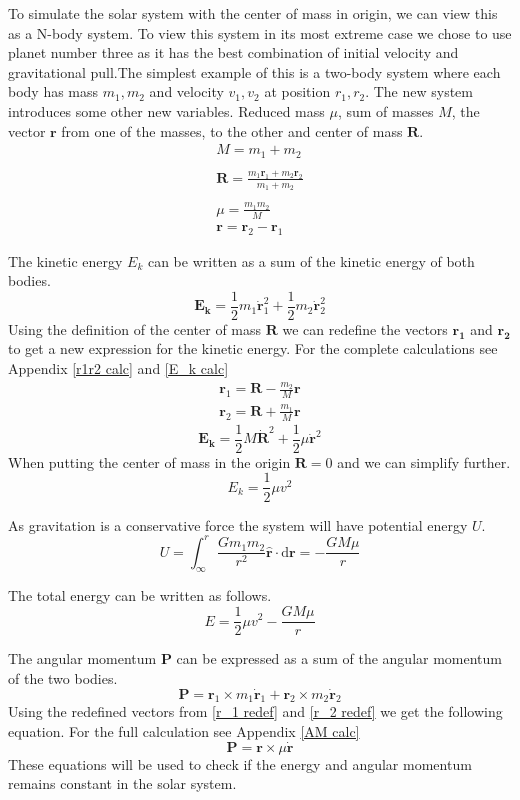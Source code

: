 \documentclass[reprint,english,notitlepage]{revtex4-2}
\begin{document}
To simulate the solar system with the center of mass in origin, we can view this as a N-body system. To view this system in its most extreme case we chose to use planet number three as it has the best combination of initial velocity and gravitational pull.The simplest example of this is a two-body system where each body has mass $ m_1 , m_2 $ and velocity $ v_1, v_2 $ at position $ r_1, r_2 $. The new system introduces some other new variables. Reduced mass $ \mu $, sum of masses $ M $, the vector $ \mathbf{r} $ from one of the masses, to the other and center of mass $ \mathbf{R} $.
\begin{align*}
	M = m_1 + m_2 \\ \\
	\mathbf{R} = \frac{m_1 \mathbf{r}_1 + m_2  \mathbf{r}_2}{m_1 + m_2} \\ \\
	μ = \frac{m_1 m_2}{M} \\ 
	\mathbf{r} = \mathbf{r}_2 - \mathbf{r}_1
\end{align*}



The kinetic energy $ E_k $ can be written as a sum of the kinetic energy of both bodies.
\[
\mathbf{E_k} = \frac{1}{2}m_1 \mathbf{\dot{r}}_{1}^{2} + \frac{1}{2}m_2 \mathbf{\dot{r}}_{2}^{2}
\]
Using the definition of the center of mass $ \mathbf{R} $ we can redefine the vectors $ \mathbf{r_1} $ and $ \mathbf{r_2} $ to get a new expression for the kinetic energy. For the complete calculations see Appendix \ref{r1r2 calc} and \ref{E_k calc}
\begin{align}
	\mathbf{r}_1 = \mathbf{R} - \frac{m_2}{M}\mathbf{r} \label{r_1 redef} \\
	\mathbf{r}_2 = \mathbf{R} + \frac{m_1}{M}\mathbf{r} \label{r_2 redef}
\end{align}
\[
\mathbf{E_k} = \frac{1}{2}M \mathbf{\dot{R}}^{2} + \frac{1}{2}μ \mathbf{\dot{r}}^{2} 
\]
When putting the center of mass in the origin $ \mathbf{R} = 0 $ and we can simplify further. 
\[
E_k = \frac{1}{2} μ v^{2}
\]

As gravitation is a conservative force the system will have potential energy $ U $. 
\[
U = ∫ _{\infty} ^{r} \frac{Gm_1 m_2}{r^{2}}\mathbf{\hat{r}} ⋅ \mathrm{d}\mathbf{r} = - \frac{GM \mu}{r}
\] 

The total energy can be written as follows. 
\[
E = \frac{1}{2}μ v^{2}  - \frac{GM\mu}{r}
\]

The angular momentum $ \mathbf{P} $ can be expressed as a sum of the angular momentum of the two bodies. 
\[
\mathbf{P} = \mathbf{r}_1 \times m_1 \mathbf{\dot{r}}_1 + \mathbf{r}_2 \times m_2 \mathbf{\dot{r}}_2
\]
Using the redefined vectors from \ref{r_1 redef} and \ref{r_2 redef}  we get the following equation. For the full calculation see Appendix \ref{AM calc}
\[
\mathbf{P} = \mathbf{r} \times \mu \mathbf{\dot{r}}
\]
These equations will be used to check if the energy and angular momentum remains constant in the solar system. 
\end{document}
